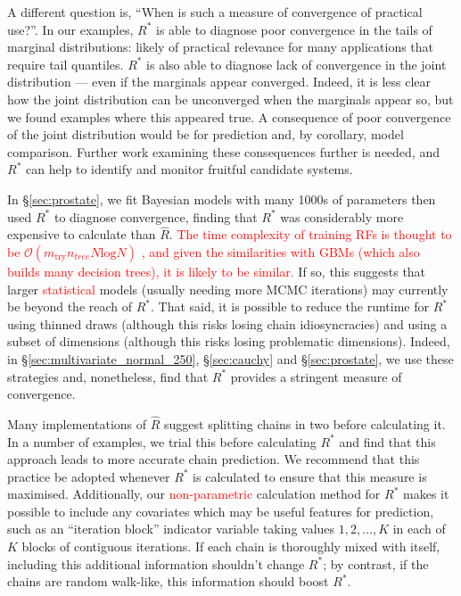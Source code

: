 \documentclass{article}
\begin{document}
A different question is, ``When is such a measure of convergence of practical use?''. In our examples, $R^*$ is able to diagnose poor convergence in the tails of marginal distributions: likely of practical relevance for many applications that require tail quantiles. $R^*$ is also able to diagnose lack of convergence in the joint distribution — even if the marginals appear converged. Indeed, it is less clear how the joint distribution can be unconverged when the marginals appear so, but we found examples where this appeared true. A consequence of poor convergence of the joint distribution would be for prediction and, by corollary, model comparison. Further work examining these consequences further is needed, and $R^*$ can help to identify and monitor fruitful candidate systems.
\color{black}

In \S\ref{sec:prostate}, we fit Bayesian models with many 1000s of parameters then used $R^*$ to diagnose convergence, finding that $R^*$ was considerably more expensive to calculate than $\widehat{R}$. \textcolor{red}{The time complexity of training RFs is thought to be $\mathcal{O}(m_{\text{try}} n_{tree} N \text{log} N)$ \cite[chapter~5]{louppe2014understanding}, and given the similarities with GBMs (which also builds many decision trees), it is likely to be similar.} If so, this suggests that larger \textcolor{red}{statistical} models (usually needing more MCMC iterations) may currently be beyond the reach of $R^*$. That said, it is possible to reduce the runtime for $R^*$ using thinned draws (although this risks losing chain idiosyncracies) and using a subset of dimensions (although this risks losing problematic dimensions). Indeed, in \S\ref{sec:multivariate_normal_250}, \S\ref{sec:cauchy} and \S\ref{sec:prostate}, we use these strategies and, nonetheless, find that $R^*$ provides a stringent measure of convergence.

Many implementations of $\widehat{R}$ suggest splitting chains in two before calculating it. In a number of examples, we trial this before calculating $R^*$ and find that this approach leads to more accurate chain prediction. We recommend that this practice be adopted whenever $R^*$ is calculated to ensure that this measure is maximised. Additionally, our \textcolor{red}{non-parametric} calculation method for $R^*$ makes it possible to include any covariates which may be useful features for prediction, such as an ``iteration block'' indicator variable taking values $1, 2, ..., K$ in each of $K$ blocks of contiguous iterations. If each chain is thoroughly mixed with itself, including this additional information shouldn't change $R^*$; by contrast, if the chains are random walk-like, this information should boost $R^*$.
\end{document}
